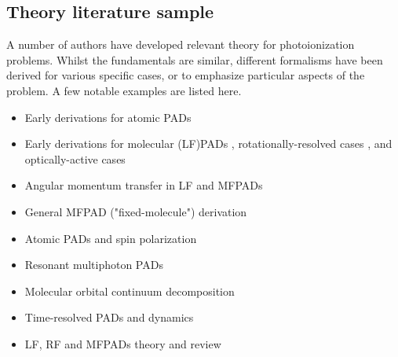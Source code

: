 \subsection{Theory literature sample\label{sec:theory-lit}}

A number of authors have developed relevant theory for photoionization problems. Whilst the fundamentals are similar, different formalisms have been derived for various specific cases, or to emphasize particular aspects of the problem. A few notable examples are listed here.

\begin{itemize}
\item Early derivations for atomic PADs \cite{Cherepkov1979,Cooper1968,Cooper1969}
\item Early derivations for molecular (LF)PADs \cite{Tully1968}, rotationally-resolved cases \cite{Buckingham1970}, and optically-active cases \cite{Ritchie1976}
\item Angular momentum transfer in LF and MFPADs \cite{Fano1972} 
\item General MFPAD ("fixed-molecule") derivation \cite{Dill1976}
\item Atomic PADs and spin polarization \cite{Klar1982}
\item Resonant multiphoton PADs \cite{Dixit1983}
\item Molecular orbital continuum decomposition \cite{Park1996}
\item Time-resolved PADs and dynamics \cite{Underwood2000,Seideman2001,Stolow2008}
\item LF, RF and MFPADs theory and review \cite{dowek2012PhotoionizationDynamicsPhotoemission}
\end{itemize}